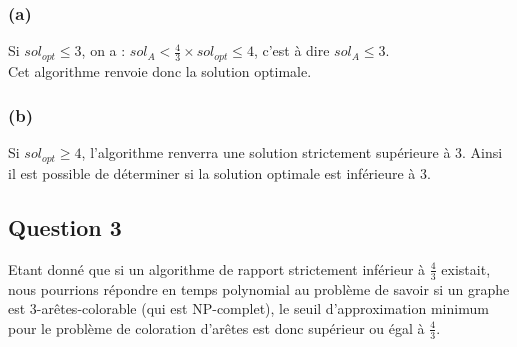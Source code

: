 \subsubsection{(a)}\label{ex11_q2_a}
Si $sol_{opt} \leq 3$, on a : $sol_A < \frac{4}{3} \times sol_{opt} \leq 4$,
c'est à dire $sol_A \leq 3$.\\
Cet algorithme renvoie donc la solution optimale.

\subsubsection{(b)}\label{ex11_q2_b}
Si $sol_{opt} \geq 4$, l'algorithme renverra une solution strictement supérieure à 3.
Ainsi il est possible de déterminer si la solution optimale est inférieure à 3.

\subsection{Question 3}\label{ex11_q3}
Etant donné que si un algorithme de rapport strictement inférieur à $\frac{4}{3}$
existait, nous pourrions répondre en temps polynomial au problème de savoir si un graphe est
3-arêtes-colorable (qui est NP-complet),
le seuil d'approximation minimum pour le problème de coloration d'arêtes est donc
supérieur ou égal à $\frac{4}{3}$.


